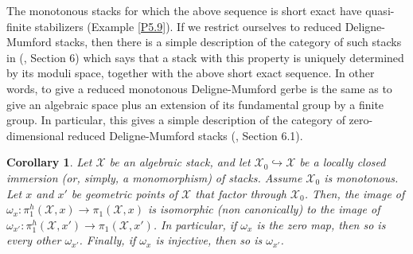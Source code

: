 \documentclass{amsart}
\newtheorem{cor}[thm]{Corollary}
\theoremstyle{definition}
\theoremstyle{remark}
\theoremstyle{remark}
\newcommand{\X}{\mathcal{X}}
\newcommand{\ox}{\omega_x}
\newcommand{\pX}{\pi_1(\X,x)}
\newcommand{\phX}{\pi_1^{h}(\X,x)}
\let\:=\colon
\begin{document}
 The monotonous stacks for which the above sequence is short exact
 have quasi-finite stabilizers (Example \ref{P5.9}). If we
 restrict ourselves to reduced Deligne-Mumford stacks, then there
 is a simple description of the category of such stacks in
 (\cite{Noohi}, Section 6) which says that a stack with this
 property is uniquely determined by its moduli space, together
 with the above short exact sequence. In other words, to give a
 reduced monotonous Deligne-Mumford gerbe is the same as to give
 an algebraic space plus an extension of its fundamental group by
 a finite group. In particular, this gives a simple description of
 the category of zero-dimensional reduced Deligne-Mumford stacks
 (\cite{Noohi}, Section 6.1).

 \begin{cor}{\label{C:im}}
 Let $\X$ be an algebraic stack, and let $\X_0 \hookrightarrow \X$ be a locally closed immersion
 (or, simply, a monomorphism) of stacks. Assume $\X_0$ is monotonous.
 Let $x$ and $x'$ be geometric points of $\X$ that factor through $\X_0$.  Then, the image of
 $\ox \: \phX \to \pX$ is
 isomorphic (non canonically) to the image of $\omega_{x'} \: \pi_1^h(\X,x') \to \pi_1(\X,x')$.
 In particular, if $\ox$ is the zero map, then
 so is every other $\omega_{x'}$. Finally, if $\ox$ is injective, then so is $\omega_{x'}$.
 \end{cor}
\end{document}
